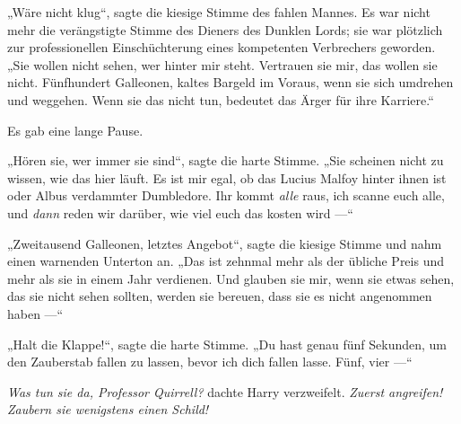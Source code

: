 „Wäre nicht klug“, sagte die kiesige Stimme des fahlen Mannes. Es war nicht mehr die verängstigte Stimme des Dieners des Dunklen Lords; sie war plötzlich zur professionellen Einschüchterung eines kompetenten Verbrechers geworden.
„Sie wollen nicht sehen, wer hinter mir steht. Vertrauen sie mir, das wollen sie nicht. Fünfhundert Galleonen, kaltes Bargeld im Voraus, wenn sie sich umdrehen und weggehen. Wenn sie das nicht tun, bedeutet das Ärger für ihre Karriere.“

Es gab eine lange Pause.

„Hören sie, wer immer sie sind“, sagte die harte Stimme.
„Sie scheinen nicht zu wissen, wie das hier läuft. Es ist mir egal, ob das Lucius Malfoy hinter ihnen ist oder Albus verdammter Dumbledore. Ihr kommt \emph{alle} raus, ich scanne euch alle, und \emph{dann} reden wir darüber, wie viel euch das kosten wird —“

„Zweitausend Galleonen, letztes Angebot“, sagte die kiesige Stimme und nahm einen warnenden Unterton an.
„Das ist zehnmal mehr als der übliche Preis und mehr als sie in einem Jahr verdienen. Und glauben sie mir, wenn sie etwas sehen, das sie nicht sehen sollten, werden sie bereuen, dass sie es nicht angenommen haben —“

„Halt die Klappe!“, sagte die harte Stimme.
„Du hast genau fünf Sekunden, um den Zauberstab fallen zu lassen, bevor ich dich fallen lasse. Fünf, vier —“

\emph{Was tun sie da, Professor Quirrell?} dachte Harry verzweifelt. \emph{Zuerst angreifen! Zaubern sie wenigstens einen Schild!}

